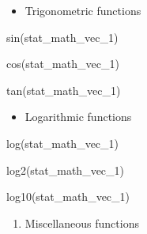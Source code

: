 \documentclass[
  letterpaper,
  DIV=11,
  numbers=noendperiod]{scrreprt}
\newenvironment{Shaded}{}{}
\newcommand{\FunctionTok}[1]{\textcolor[rgb]{0.44,0.26,0.76}{#1}}
\newcommand{\NormalTok}[1]{\textcolor[rgb]{0.14,0.16,0.18}{#1}}
\providecommand{\tightlist}{%
  \setlength{\itemsep}{0pt}\setlength{\parskip}{0pt}}\usepackage{longtable,booktabs,array}
\begin{document}
\begin{itemize}
\tightlist
\item
  Trigonometric functions
\end{itemize}

\begin{Shaded}
\begin{Highlighting}[]
\FunctionTok{sin}\NormalTok{(stat\_math\_vec\_1)}
\end{Highlighting}
\end{Shaded}

\begin{Shaded}
\begin{Highlighting}[]
\FunctionTok{cos}\NormalTok{(stat\_math\_vec\_1)}
\end{Highlighting}
\end{Shaded}

\begin{Shaded}
\begin{Highlighting}[]
\FunctionTok{tan}\NormalTok{(stat\_math\_vec\_1)}
\end{Highlighting}
\end{Shaded}

\begin{itemize}
\tightlist
\item
  Logarithmic functions
\end{itemize}

\begin{Shaded}
\begin{Highlighting}[]
\FunctionTok{log}\NormalTok{(stat\_math\_vec\_1)}
\end{Highlighting}
\end{Shaded}

\begin{Shaded}
\begin{Highlighting}[]
\FunctionTok{log2}\NormalTok{(stat\_math\_vec\_1)}
\end{Highlighting}
\end{Shaded}

\begin{Shaded}
\begin{Highlighting}[]
\FunctionTok{log10}\NormalTok{(stat\_math\_vec\_1)}
\end{Highlighting}
\end{Shaded}

\begin{enumerate}
\def\labelenumi{\arabic{enumi}.}
\setcounter{enumi}{3}
\tightlist
\item
  Miscellaneous functions
\end{enumerate}
\end{document}
